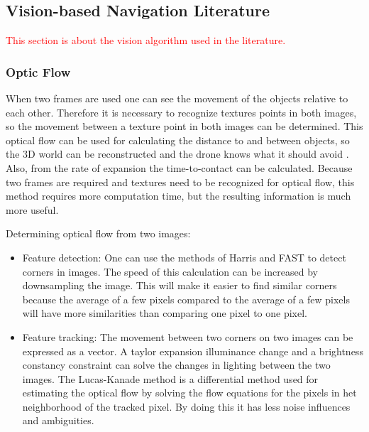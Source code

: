 \subsection{Vision-based Navigation Literature}
\label{subsec:lit_vision}
\textcolor{red}{This section is about the vision algorithm used in the literature.}

\subsubsection{Optic Flow}


When two frames are used one can see the movement of the objects relative to each other. Therefore it is necessary to recognize textures points in both images, so the movement between a texture point in both images can be determined. This optical flow can be used for calculating the distance to and between objects, so the 3D world can be reconstructed and the drone knows what it should avoid \cite{Gibson}. Also, from the rate of expansion the time-to-contact can be calculated. Because two frames are required and textures need to be recognized for optical flow, this method requires more computation time, but the resulting information is much more useful.

Determining optical flow from two images:
\begin{itemize}
\item Feature detection: One can use the methods of Harris and FAST to detect corners in images. The speed of this calculation can be increased by downsampling the image. This will make it easier to find similar corners  because the average of a few pixels compared to the average of a few pixels will have more similarities than comparing one pixel to one pixel.
\item Feature tracking: The movement between two corners on two images can be expressed as a vector. A taylor expansion illuminance change and a brightness constancy constraint   can solve the changes in lighting between the two images. The Lucas-Kanade method is a differential method used for estimating the optical flow by solving the flow equations for the pixels in het neighborhood of the tracked pixel. By doing this it has less noise influences and ambiguities.
\end{itemize}

